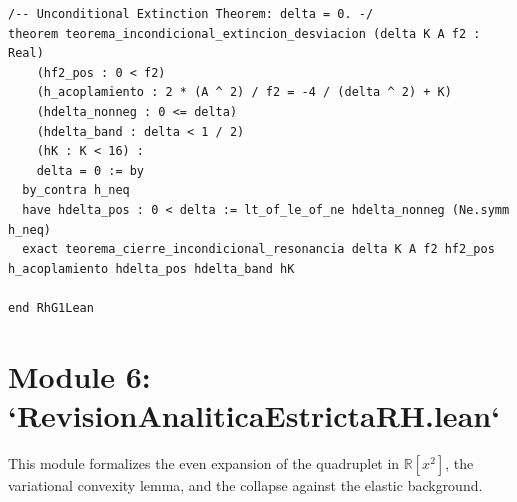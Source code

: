 \documentclass[11pt,a4paper]{article}
\theoremstyle{definition}
\theoremstyle{remark}
\begin{document}
\begin{lstlisting}[language=Lean4]
/-- Unconditional Extinction Theorem: delta = 0. -/
theorem teorema_incondicional_extincion_desviacion (delta K A f2 : Real)
    (hf2_pos : 0 < f2)
    (h_acoplamiento : 2 * (A ^ 2) / f2 = -4 / (delta ^ 2) + K)
    (hdelta_nonneg : 0 <= delta)
    (hdelta_band : delta < 1 / 2)
    (hK : K < 16) :
    delta = 0 := by
  by_contra h_neq
  have hdelta_pos : 0 < delta := lt_of_le_of_ne hdelta_nonneg (Ne.symm h_neq)
  exact teorema_cierre_incondicional_resonancia delta K A f2 hf2_pos h_acoplamiento hdelta_pos hdelta_band hK

end RhG1Lean
\end{lstlisting}

\section{Module 6: `RevisionAnaliticaEstrictaRH.lean`}

This module formalizes the even expansion of the quadruplet in $\mathbb{R}[x^2]$, the variational convexity lemma, and the collapse against the elastic background.
\end{document}
